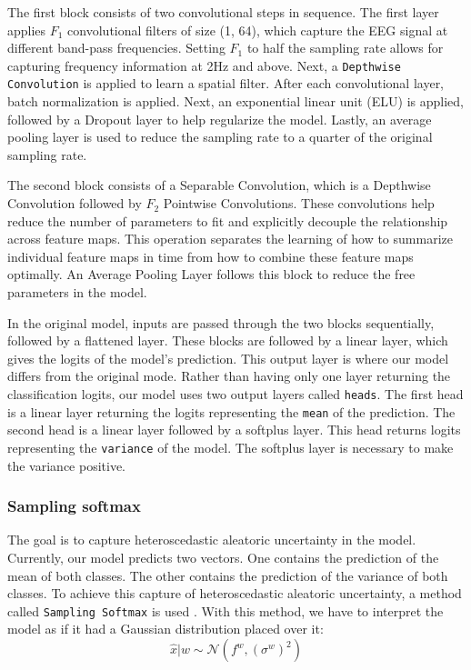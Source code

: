 The first block consists of two convolutional steps in sequence. The first layer applies $F_1$ convolutional filters of size (1, 64), which capture the EEG signal at different band-pass frequencies. Setting $F_1$ to half the sampling rate allows for capturing frequency information at 2Hz and above. Next, a \verb|Depthwise Convolution| is applied to learn a spatial filter. After each convolutional layer, batch normalization is applied. Next, an exponential linear unit (ELU) is applied, followed by a Dropout layer to help regularize the model. Lastly, an average pooling layer is used to reduce the sampling rate to a quarter of the original sampling rate.

The second block consists of a Separable Convolution, which is a Depthwise Convolution followed by $F_2$ Pointwise Convolutions. These convolutions help reduce the number of parameters to fit and explicitly decouple the relationship across feature maps. This operation separates the learning of how to summarize individual feature maps in time from how to combine these feature maps optimally. An Average Pooling Layer follows this block to reduce the free parameters in the model.

In the original model, inputs are passed through the two blocks sequentially, followed by a flattened layer. These blocks are followed by a linear layer, which gives the logits of the model's prediction. This output layer is where our model differs from the original mode. Rather than having only one layer returning the classification logits, our model uses two output layers called \verb|heads|. The first head is a linear layer returning the logits representing the \verb|mean| of the prediction. The second head is a linear layer followed by a softplus layer. This head returns logits representing the \verb|variance| of the model. The softplus layer is necessary to make the variance positive.


\subsubsection{Sampling softmax}

The goal is to capture heteroscedastic aleatoric uncertainty in the model. Currently, our model predicts two vectors. One contains the prediction of the mean of both classes. The other contains the prediction of the variance of both classes. To achieve this capture of heteroscedastic aleatoric uncertainty, a method called \verb|Sampling Softmax| is used \citep{kendall2017uncertainties}. With this method, we have to interpret the model as if it had a Gaussian distribution placed over it:
\begin{equation}
    \hat{x}|w \sim \mathcal{N}(f^w, (\sigma^w)^2)
\end{equation}

